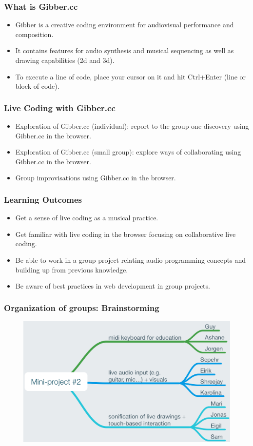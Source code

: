 \documentclass[screen, aspectratio=43]{beamer}
\begin{document}
%
\begin{frame}
\frametitle{What is Gibber.cc}
\begin{itemize}
\item Gibber is a creative coding environment for audiovisual performance and composition. 
\item It contains features for audio synthesis and musical sequencing as well as drawing capabilities (2d and 3d).
\item To execute a line of code, place your cursor on it and hit Ctrl+Enter (line or block of code).
\end{itemize}
\end{frame}
\begin{frame}
\frametitle{Live Coding with Gibber.cc}
\begin{itemize}
\item Exploration of Gibber.cc (individual): report to the group one discovery using Gibber.cc in the browser.
\item Exploration of Gibber.cc (small group): explore ways of collaborating using Gibber.cc in the browser.
\item Group improvisations using Gibber.cc in the browser.
\end{itemize}
\end{frame}
%
\begin{frame}
\frametitle{Learning Outcomes}
\begin{itemize}
\item Get a sense of live coding as a musical practice.
\item Get familiar with live coding in the browser focusing on collaborative live coding.
\item Be able to work in a group project relating audio programming concepts and building up from previous knowledge.
\item Be aware of best practices in web development in group projects.
\end{itemize}
\end{frame}
%
\begin{frame}
\frametitle{Organization of groups: Brainstorming}
   \begin{figure}
	\includegraphics[scale=0.4]{img/groups-mini-project-2.png}
   \end{figure}
\end{frame}
\end{document}
